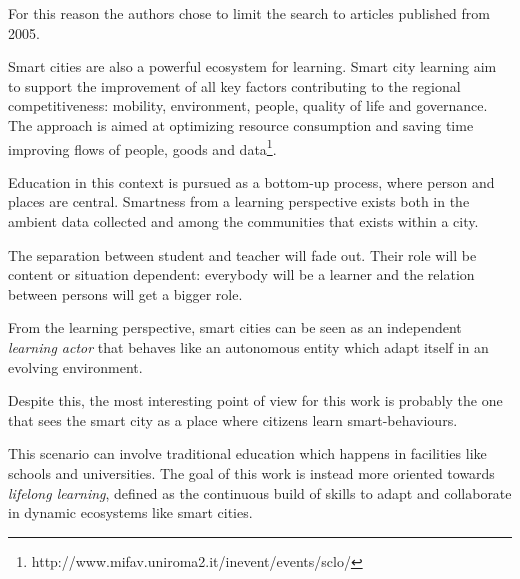 For this reason the authors chose to limit the search to articles published from 2005.

Smart cities are also a powerful ecosystem for learning. Smart city learning aim to support the improvement of all key factors contributing to the regional competitiveness: mobility, environment, people, quality of life and governance. The approach is aimed at optimizing resource consumption and saving time improving flows of people, goods and data\footnote{http://www.mifav.uniroma2.it/inevent/events/sclo/}.

Education in this context is pursued as a bottom-up process, where person and places are central. Smartness from a learning perspective exists both in the ambient data collected and among the communities that exists within a city.

The separation between student and teacher will fade out. Their role will be content or situation dependent: everybody will be a learner and the relation between persons will get a bigger role.

From the learning perspective, smart cities can be seen as an independent \textit{learning actor} that behaves like an autonomous entity which adapt itself in an evolving environment.

Despite this, the most interesting point of view for this work is probably the one that sees the smart city as a place where citizens learn smart-behaviours.

This scenario can involve traditional education which happens in facilities like schools and universities. The goal of this work is instead more oriented towards \textit{lifelong learning}, defined as the continuous build of skills to adapt and collaborate in dynamic ecosystems like smart cities.